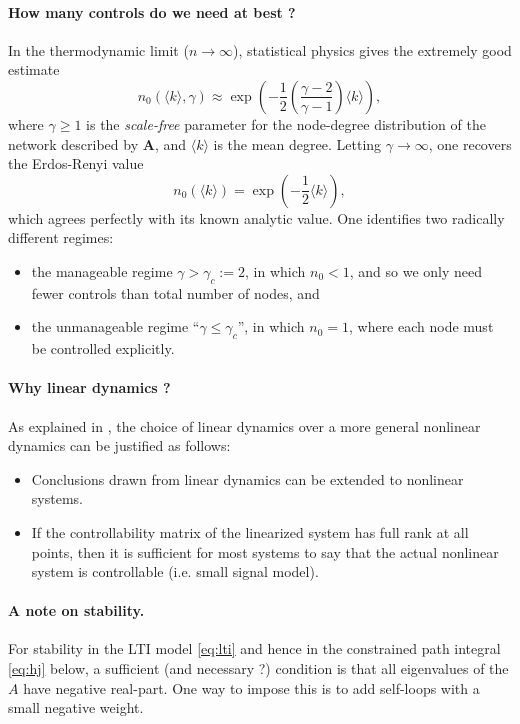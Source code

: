 \documentclass{article} %
\def\A{\mathbf{A}}
\begin{document}
\paragraph{How many controls do we need at best ?}
In the thermodynamic limit ($n \rightarrow \infty$), statistical physics \citep{Liu2011} gives the extremely good estimate
\begin{equation}
  n_0(\langle k\rangle, \gamma) \approx \exp\left(-\frac{1}{2}\left(\frac{\gamma-2}{\gamma - 1}\right)\langle k \rangle\right),
\end{equation}
where $\gamma \ge 1$ is the \textit{scale-free} parameter for the node-degree distribution of the network described by $\A$, and $\langle k \rangle$ is the mean degree. Letting $\gamma \rightarrow \infty$, one recovers the Erdos-Renyi value
\begin{equation}
  n_0(\langle k\rangle) = \exp\left(-\frac{1}{2}\langle k\rangle\right),
\end{equation}
which agrees perfectly with its known analytic value. One identifies two radically different regimes:
\begin{itemize}
  \item the manageable regime $\gamma > \gamma_c := 2$, in which $n_0 < 1$, and so we only need fewer controls than total number of nodes, and
\item the unmanageable regime ``$\gamma \le \gamma_c$'', in which  $n_0 = 1$, where each node must be controlled explicitly.
\end{itemize}

\paragraph{Why linear dynamics ?}
As explained in \citep{Liu2011}, the choice of linear dynamics over a more general nonlinear dynamics can be justified as follows:
\begin{itemize}
  \item  Conclusions drawn from linear dynamics can be
extended to nonlinear systems.
\item If the controllability matrix of the linearized system
has full rank at all points, then it is sufficient for most
systems to say that the actual nonlinear system is
controllable (i.e. small signal model).
\end{itemize}

\paragraph{A note on stability.}
For stability in the LTI model \eqref{eq:lti} and hence in the constrained path integral \eqref{eq:hj} below, a sufficient (and necessary ?) condition is that all eigenvalues of the $A$ have negative real-part. One way to impose this is to add self-loops with a small negative weight.
\end{document}
